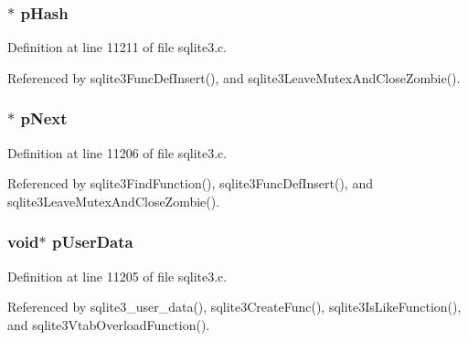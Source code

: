 \hypertarget{struct_func_def_aa8c6f56dcfbdae15ece45ba7b71a13bb}{}
\subsubsection[{p\+Hash}]{$\ast$ p\+Hash}\label{struct_func_def_aa8c6f56dcfbdae15ece45ba7b71a13bb}


Definition at line 11211 of file sqlite3.\+c.



Referenced by sqlite3\+Func\+Def\+Insert(), and sqlite3\+Leave\+Mutex\+And\+Close\+Zombie().

\hypertarget{struct_func_def_ad76d035fd062a7a1568a052ede09ea6e}{}
\subsubsection[{p\+Next}]{$\ast$ p\+Next}\label{struct_func_def_ad76d035fd062a7a1568a052ede09ea6e}


Definition at line 11206 of file sqlite3.\+c.



Referenced by sqlite3\+Find\+Function(), sqlite3\+Func\+Def\+Insert(), and sqlite3\+Leave\+Mutex\+And\+Close\+Zombie().

\hypertarget{struct_func_def_a8d75dbe9027a94780bc2f31670400613}{}
\subsubsection[{p\+User\+Data}]{\setlength{\rightskip}{0pt plus 5cm}void$\ast$ p\+User\+Data}\label{struct_func_def_a8d75dbe9027a94780bc2f31670400613}


Definition at line 11205 of file sqlite3.\+c.



Referenced by sqlite3\+\_\+user\+\_\+data(), sqlite3\+Create\+Func(), sqlite3\+Is\+Like\+Function(), and sqlite3\+Vtab\+Overload\+Function().

\hypertarget{struct_func_def_a41e296d3e0af2a6f7c80c94139988e77}{}
